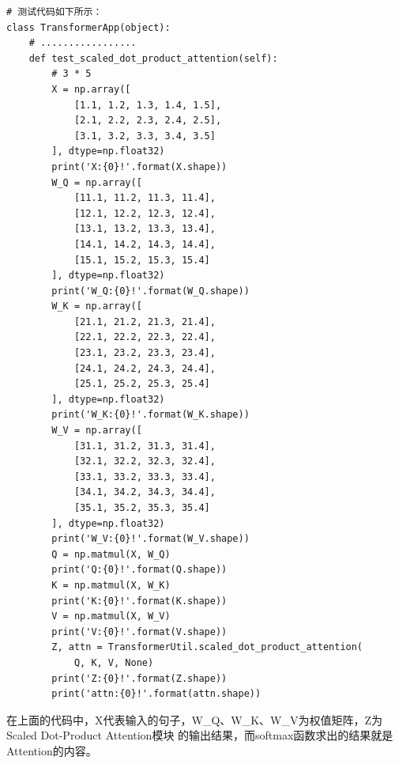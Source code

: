 \documentclass{article}
\begin{document}
\begin{lstlisting}
# 测试代码如下所示：
class TransformerApp(object):
    # .................
    def test_scaled_dot_product_attention(self):
        # 3 * 5
        X = np.array([
            [1.1, 1.2, 1.3, 1.4, 1.5],
            [2.1, 2.2, 2.3, 2.4, 2.5],
            [3.1, 3.2, 3.3, 3.4, 3.5]
        ], dtype=np.float32)
        print('X:{0}!'.format(X.shape))
        W_Q = np.array([
            [11.1, 11.2, 11.3, 11.4],
            [12.1, 12.2, 12.3, 12.4],
            [13.1, 13.2, 13.3, 13.4],
            [14.1, 14.2, 14.3, 14.4],
            [15.1, 15.2, 15.3, 15.4]
        ], dtype=np.float32)
        print('W_Q:{0}!'.format(W_Q.shape))
        W_K = np.array([
            [21.1, 21.2, 21.3, 21.4],
            [22.1, 22.2, 22.3, 22.4],
            [23.1, 23.2, 23.3, 23.4],
            [24.1, 24.2, 24.3, 24.4],
            [25.1, 25.2, 25.3, 25.4]
        ], dtype=np.float32)
        print('W_K:{0}!'.format(W_K.shape))
        W_V = np.array([
            [31.1, 31.2, 31.3, 31.4],
            [32.1, 32.2, 32.3, 32.4],
            [33.1, 33.2, 33.3, 33.4],
            [34.1, 34.2, 34.3, 34.4],
            [35.1, 35.2, 35.3, 35.4]
        ], dtype=np.float32)
        print('W_V:{0}!'.format(W_V.shape))
        Q = np.matmul(X, W_Q)
        print('Q:{0}!'.format(Q.shape))
        K = np.matmul(X, W_K)
        print('K:{0}!'.format(K.shape))
        V = np.matmul(X, W_V)
        print('V:{0}!'.format(V.shape))
        Z, attn = TransformerUtil.scaled_dot_product_attention(
            Q, K, V, None)
        print('Z:{0}!'.format(Z.shape))
        print('attn:{0}!'.format(attn.shape))
\end{lstlisting}
在上面的代码中，X代表输入的句子，W\_Q、W\_K、W\_V为权值矩阵，Z为Scaled Dot-Product Attention模块
的输出结果，而softmax函数求出的结果就是Attention的内容。
\end{document}
